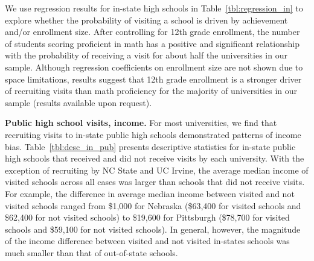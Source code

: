 \documentclass[twoside]{article}
\begin{document}
We use regression results for in-state high schools in Table~\ref{tbl:regression_in} to explore whether the probability of visiting a school is driven by achievement and/or enrollment size. After controlling for 12th grade enrollment, the number of students scoring proficient in math has a positive and significant relationship with the probability of receiving a visit for about half the universities in our sample. Although regression coefficients on enrollment size are not shown due to space limitations, results suggest that 12th grade enrollment is a stronger driver of recruiting visits than math proficiency for the majority of universities in our  sample (results available upon request).

\textbf{Public high school visits, income.} For most universities, we find that recruiting visits to in-state public high schools demonstrated patterns of income bias. Table~\ref{tbl:desc_in_pub} presents descriptive statistics for in-state public high schools that received and did not receive visits by each university.  With the exception of recruiting by NC State and UC Irvine, the average median income of visited schools across all cases was larger than schools that did not receive visits. For example, the difference in average median income between visited and not visited schools ranged from \$1,000 for Nebraska (\$63,400 for visited schools and \$62,400 for not visited schools) to \$19,600 for Pittsburgh (\$78,700 for visited schools and \$59,100 for not visited schools). In general, however, the magnitude of the income difference between visited and not visited in-states schools was much smaller than that of out-of-state schools. 


\end{document}

